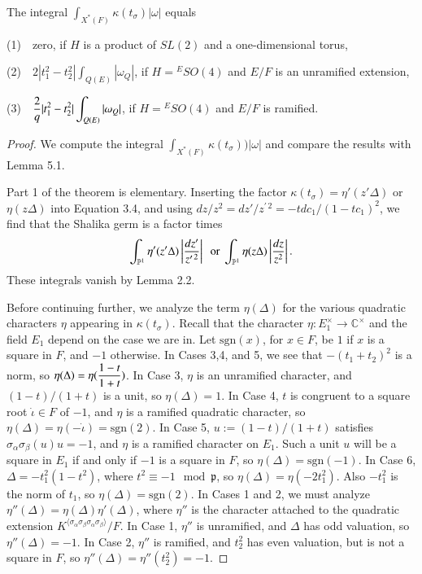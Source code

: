 \documentclass{amsart}
\newcommand\jota{{\dot\iota}}
\newcommand\bP{{\mathbb P}}
\newcommand\pp{{\mathfrak p}}
\newcommand\C{{\mathbb C}}
\newenvironment{cthm}[1]
  {\renewcommand\thethm{\sc #1}\thm}
  {\endthm}
\begin{document}
\bigskip
\noindent
\begin{cthm}{Theorem 5.2} The integral 
$\int_{X^*(F)} \kappa(t_\sigma)|\omega|$ equals

\noindent
(1)\ \
  zero, if $H$ is a product of $SL(2)$ and a one-dimensional torus,

\noindent
(2)\ \  $\displaystyle 2 |t_1^2-t_2^2| \int_{Q(E)} |\omega_Q|$, if
$H = {}^ESO(4)$ and $E/F$ is an unramified extension,

\noindent
(3)\ \  $\displaystyle{2\over q} |t_1^2-t_2^2| \int_{Q(E)} |\omega_Q|$, if
$H = {}^ESO(4)$ and $E/F$ is ramified.
\end{cthm}

\bigskip
\noindent
\begin{proof}  We compute the integral $\int_{X^*(F)} \kappa(t_\sigma))
|\omega|$ and compare the results with Lemma 5.1.

Part 1 of the theorem is elementary.
Inserting the factor $\kappa(t_\sigma) = \eta'(z'\Delta)$ or
$\eta(z\Delta)$
into
Equation 3.4, and using $dz/z^2= dz'/z^{\prime\,2}
 = -t dc_1/(1 - t c_1)^2$, we find
that the Shalika germ is a factor times
$$ \int_{\bP^1} \eta'(z' \Delta) \left|
{ dz'\over z^{\prime\,2}}\right | \ \text{ or }
\int_{\bP^1} \eta(z \Delta) \left|
{ dz\over z^2}\right |.$$
These integrals vanish by Lemma 2.2.

Before continuing further, we analyze the term $\eta(\Delta)$
for the various quadratic characters $\eta$ appearing in
$\kappa(t_\sigma)$.  Recall that the character 
$\eta:E_1^\times\to\C^\times$ and the field $E_1$ 
depend on the case we are in.  Let $\text{sgn}(x)$, for
$x\in F$, be $1$ if $x$ is a square in $F$, and $-1$
otherwise.
In Cases 3,4, and 5, we see that $-(t_1+t_2)^2$ is a norm,
so $\eta(\Delta)=\eta(\displaystyle{1-t\over 1+t})$.
In Case 3, $\eta$ is an unramified character, and
$(1-t)/(1+t)$ is a unit, so $\eta(\Delta)=1$.  In Case 4,
$t$ is congruent to a square root $\jota\in F$ of $-1$, and
$\eta$ is a ramified quadratic character, so
$\eta(\Delta)=\eta(-\jota) = \text{sgn}(2)$.  In Case 5,
$u:= (1-t)/(1+t)$ satisfies $\sigma_{\alpha}\sigma_\beta(u)u= -1$,
and $\eta$ is a ramified character on $E_1$.  Such a unit 
$u$ will be a square in $E_1$ if and only if $-1$ is a square in $F$,
so $\eta(\Delta) = \text{sgn}(-1)$.
In Case 6, $\Delta = -t_1^2 (1-t^2)$,
where $t^2 \equiv -1 \mod\pp$, so $\eta(\Delta) =\eta(-2t_1^2)$.
Also $-t_1^2$ is the norm of $t_1$, so $\eta(\Delta) = \text{sgn}(2)$.
In Cases 1 and 2, we must analyze 
$\eta''(\Delta)=\eta(\Delta)\eta'(\Delta) $,
where $\eta''$ is the character attached to the quadratic
extension $K^{\langle\sigma_\alpha\sigma_\beta\sigma_\alpha\sigma_\beta\rangle}/F$.  
In Case 1, $\eta''$ is unramified, and $\Delta$ has odd
valuation, so $\eta''(\Delta) = -1$.  In Case 2, $\eta''$ is
ramified, and $t_2^2$ has even valuation, but is not a square
in $F$,
so $\eta''(\Delta) = \eta''(t_2^2) = -1$.


\end{proof}
\end{document}

